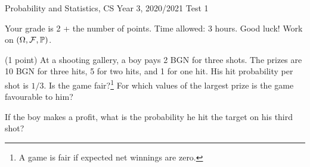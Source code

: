 \documentclass[a4paper]{report}
\newif\ifshowsolutions
\begin{document}
\noindent Probability and Statistics, CS Year 3, 2020/2021 \hfill Test 1\ifshowsolutions: solutions\fi
\hrulefill
\begin{it}Your grade is 2 + the number of points. Time allowed: 3 hours. Good luck! Work on $(\Omega,\mathcal F,\P)$.\end{it}
\begin{problem} (1 point)
At a shooting gallery, a boy pays 2 BGN for three shots. The prizes are 10 BGN for three hits, 5 for two hits, and 1 for one hit. His hit probability per shot is $1/3$. Is the game fair?\footnote{A game is fair if expected net winnings are zero.} For which values of the largest prize is the game favourable to him?
\ifshowsolutions
\par\textbf{Solution.} (0.6 points for the main part + 0.1 for $y>12$.) Let the largest prize be $y$. Then
\begin{align*}
\E X={}&-2\binom30(2/3)^3-\binom31(1/3)(2/3)^2\\
&+3\binom32(1/3)^2(2/3)+(y-2)\binom33(1/3)^3=\frac{y-2}{27}.
\end{align*}
Thus the game is favourable for $y>12$, unfavourable for $y<12$, and in particular is not fair when $y=10$.
\fi
If the boy makes a profit, what is the probability he hit the target on his third shot?
\ifshowsolutions
\par\textbf{Solution.} (0.3 points.) Write $Y$ for a hit and $N$ for a miss. The probability of missing the third shot is
\[\P(YYN\mid\{YYN,YNY,NYY,NNN\})=\frac{2/27}{3\cdot2/27+1/27}=\frac27.\]
The answer is therefore $1-2/7=5/7$.
\fi
\end{problem}
\end{document}
